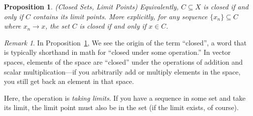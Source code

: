\documentclass[12pt]{book}
\numberwithin{equation}{section} %
\theoremstyle{plain}
\newtheorem{prop}[thm]{Proposition}
\theoremstyle{definition}
\theoremstyle{remark}
\newtheorem*{rmk}{Remark}
\begin{document}
\begin{prop}{\emph{(Closed Sets, Limit Points)}}
\label{prop:closed}
Equivalently, $C\subseteq X$ is \emph{closed} if and only if $C$
contains its limit points. More explicitly, for any sequence
$\{x_n\}\subseteq C$ where $x_n\rightarrow x$, the set $C$ is closed if
and only if $x\in C$.
\end{prop}
\begin{rmk}
In Proposition~\ref{prop:closed}, We see the origin of the term
``closed'', a word that is typically shorthand in math for ``closed
under some operation.'' In vector spaces, elements of the space are
``closed'' under the operations of addition and scalar
multiplication---if you arbitrarily add or multiply elements in the
space, you still get back an element in that space.

Here, the operation is \emph{taking limits}. If you have a sequence in
some set and take its limit, the limit point must also be in the set (if
the limit exists, of course).
\end{rmk}
\end{document}
